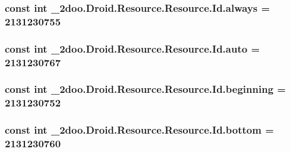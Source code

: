 \hypertarget{class__2doo_1_1_droid_1_1_resource_1_1_id_45846002a6cb7565268614e0983e35a2}{
\subsubsection[{always}]{\setlength{\rightskip}{0pt plus 5cm}const int \_\-2doo.Droid.Resource.Resource.Id.always = 2131230755}}
\label{class__2doo_1_1_droid_1_1_resource_1_1_id_45846002a6cb7565268614e0983e35a2}


\hypertarget{class__2doo_1_1_droid_1_1_resource_1_1_id_fa71d204796877908ca7716a0906dd80}{
\subsubsection[{auto}]{\setlength{\rightskip}{0pt plus 5cm}const int \_\-2doo.Droid.Resource.Resource.Id.auto = 2131230767}}
\label{class__2doo_1_1_droid_1_1_resource_1_1_id_fa71d204796877908ca7716a0906dd80}


\hypertarget{class__2doo_1_1_droid_1_1_resource_1_1_id_2801e9d15736f320a0532aba68d446ee}{
\subsubsection[{beginning}]{\setlength{\rightskip}{0pt plus 5cm}const int \_\-2doo.Droid.Resource.Resource.Id.beginning = 2131230752}}
\label{class__2doo_1_1_droid_1_1_resource_1_1_id_2801e9d15736f320a0532aba68d446ee}


\hypertarget{class__2doo_1_1_droid_1_1_resource_1_1_id_287c1ef7c6a675f21daa432c42057faf}{
\subsubsection[{bottom}]{\setlength{\rightskip}{0pt plus 5cm}const int \_\-2doo.Droid.Resource.Resource.Id.bottom = 2131230760}}
\label{class__2doo_1_1_droid_1_1_resource_1_1_id_287c1ef7c6a675f21daa432c42057faf}


